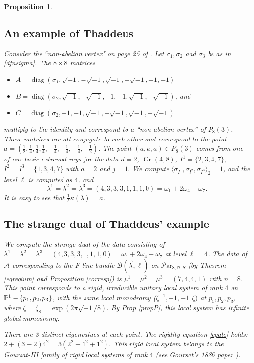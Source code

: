 \documentclass[11pt]{amsart}
\newcommand\op{\operatorname}
\newcommand\symbo{\sqrt{-1}}
\newcommand\Par{\mathcal{P}\text{ar} }
\newcommand\Gr{\operatorname{Gr}}
\newtheorem{proposition}[theorem]{Proposition}
\numberwithin{theorem}{subsection}
\begin{document}
{\begin{proposition}
\subsection{An example of Thaddeus}
Consider the ``non-abelian vertex" on page 25 of \cite{thaddy}. Let $\sigma_1,\sigma_2$ and $\sigma_3$ be as in \eqref{dfnsigma}.
The $8\times 8$ matrices
\begin{itemize}
\item $A=\op{diag}(\sigma_1,\sqrt{-1}, -\symbo, \symbo,-\symbo,-1,-1)$
\item $B=\op{diag}(\sigma_2,\sqrt{-1},-\sqrt{-1},-1,-1, \symbo, -\symbo)$, and
\item $C=\op{diag}(\sigma_2,-1,-1,\sqrt{-1},-\sqrt{-1}, \symbo, -\symbo)$
\end{itemize}
multiply to the identity and correspond to a ``non-abelian vertex'' of $P_8(3)$. These matrices are all conjugate to each other and correspond to the point $a=(\frac{1}{2}, \frac{1}{4},\frac{1}{4},\frac{1}{4},-\frac{1}{4},-\frac{1}{4},-\frac{1}{4}, -\frac{1}{2})$. The point $(a,a,a)\in P_8(3)$ comes from one of our basic extremal rays for the data
$d=2$, $\Gr(4,8)$, $I^1=\{2,3,4,7\}$, $I^2=I^3=\{1,3,4,7\}$ with $a=2$ and $j=1$.  We compute
$\langle\sigma_{I^1},\sigma_{I^2},\sigma_{I^3}\rangle_2=1$, and the level $\ell$ is computed as $4$, and
$$\lambda^1=\lambda^2=\lambda^3=(4,3,3,3,1,1,1,0)=\omega_1+2\omega_4+\omega_7.$$ It is easy to see that
$\frac{1}{\ell}\kappa(\lambda)=a$.
\subsection{The strange dual of Thaddeus' example}\label{E1}
We compute the strange dual of the data consisting of $\lambda^1=\lambda^2=\lambda^3=(4,3,3,3,1,1,1,0)=\omega_1+2\omega_4+\omega_7$ at level $\ell=4$.
The data of $\mathcal{A}$ corresponding to the F-line bundle $\mathcal{B}(\vec{\lambda},\ell)$ on
$\Par_{8,\mathcal{O},S}$ (by Theorem \ref{egregium} and Proposition  \ref{corresp}) is $\mu^1=\mu^2=\mu^3=(7,4,4,1)$ with $n=8$.
This point corresponds to a rigid, irreducible unitary local system of rank $4$ on $\Bbb{P}^1-\{p_1,p_2,p_3\}$, with the same local monodromy ($\zeta^{-1},-1,-1,\zeta)$ at $p_1,p_2,p_3$, where
$\zeta=\zeta_8=\exp(2\pi\sqrt{-1}/8)$. By Prop \ref{propP}, this local system has infinite global monodromy.

There are 3 distinct eigenvalues at each point. The rigidity equation \eqref{egale} holds: $2 +(3-2)4^2= 3(2^2+1^2+1^2)$. This rigid local system belongs to the Goursat-III family of rigid local systems of rank $4$  (see Goursat's 1886 paper \cites{EGoursat}).


\end{proposition}}
\end{document}
